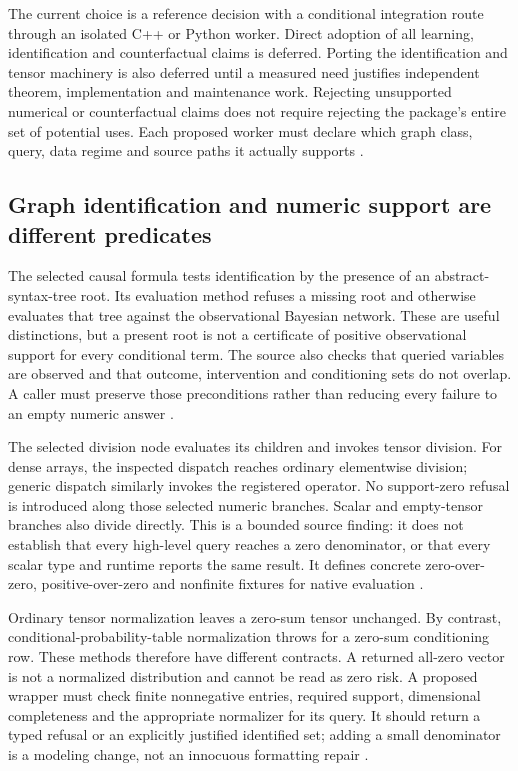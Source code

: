 The current choice is a reference decision with a conditional integration
route through an isolated C++ or Python worker. Direct adoption of all
learning, identification and counterfactual claims is deferred. Porting the
identification and tensor machinery is also deferred until a measured need
justifies independent theorem, implementation and maintenance work.
Rejecting unsupported numerical or counterfactual claims does not require
rejecting the package's entire set of potential uses. Each proposed worker
must declare which graph class, query, data regime and source paths it
actually supports \citep{exec24_agrum_choice}.

\subsection{Graph identification and numeric support are different predicates}
The selected causal formula tests identification by the presence of an
abstract-syntax-tree root. Its evaluation method refuses a missing root and
otherwise evaluates that tree against the observational Bayesian network.
These are useful distinctions, but a present root is not a certificate of
positive observational support for every conditional term. The source also
checks that queried variables are observed and that outcome, intervention
and conditioning sets do not overlap. A caller must preserve those
preconditions rather than reducing every failure to an empty numeric answer
\citep{exec24_agrum_source}.

The selected division node evaluates its children and invokes tensor
division. For dense arrays, the inspected dispatch reaches ordinary
elementwise division; generic dispatch similarly invokes the registered
operator. No support-zero refusal is introduced along those selected
numeric branches. Scalar and empty-tensor branches also divide directly.
This is a bounded source finding: it does not establish that every
high-level query reaches a zero denominator, or that every scalar type and
runtime reports the same result. It defines concrete zero-over-zero,
positive-over-zero and nonfinite fixtures for native evaluation
\citep{exec24_agrum_source,exec24_agrum_choice}.

Ordinary tensor normalization leaves a zero-sum tensor unchanged. By
contrast, conditional-probability-table normalization throws for a zero-sum
conditioning row. These methods therefore have different contracts.
A returned all-zero vector is not a normalized distribution and cannot be
read as zero risk. A proposed wrapper must check finite nonnegative entries,
required support, dimensional completeness and the appropriate normalizer
for its query. It should return a typed refusal or an explicitly justified
identified set; adding a small denominator is a modeling change, not an
innocuous formatting repair \citep{exec24_agrum_source,exec24_agrum_choice}.

